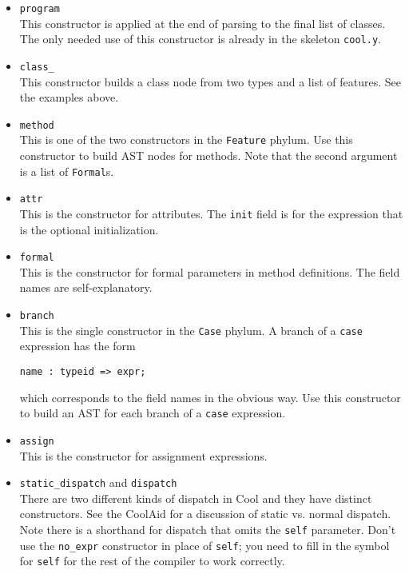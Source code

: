 \documentclass[11pt]{article}
\begin{document}
\begin{itemize}
\item {\tt program} \\
This constructor is applied at the end of parsing to the final list of classes.
The only needed use of this constructor is already  in the skeleton {\tt cool.y}.

\item {\tt class\_} \\
This constructor builds a class node from two types and a list of features.
See the examples above.

\item {\tt method} \\
This is one of the two constructors in the {\tt Feature} phylum.  Use
this constructor to build AST nodes for methods.  Note that the second
argument is a list of {\tt Formal}s.

\item {\tt attr} \\
This is the constructor for attributes.  The {\tt init} field is for the expression
that is the optional initialization.

\item {\tt formal} \\
This is the constructor for formal parameters in method definitions.  The field names are
self-explanatory.

\item {\tt branch} \\
This is the single constructor in the {\tt Case} phylum.  A branch of a {\tt case}
expression has the form
\begin{verbatim}
name : typeid => expr;
\end{verbatim}
which corresponds to the field names in the obvious way.  Use this constructor
to build an AST for each branch of a {\tt case} expression.

\item {\tt assign} \\
This is the constructor for assignment expressions.

\item {\tt static\_dispatch} and {\tt dispatch} \\
There are two different kinds of dispatch in Cool and they have distinct constructors.
See the CoolAid for a discussion of static vs. normal dispatch.  Note
there is a shorthand for dispatch that omits the {\tt self} parameter. Don't
use the {\tt no\_expr} constructor in place of {\tt self}; you need to fill in
the symbol for {\tt self} for the rest of the compiler to work correctly.


\end{itemize}
\end{document}
